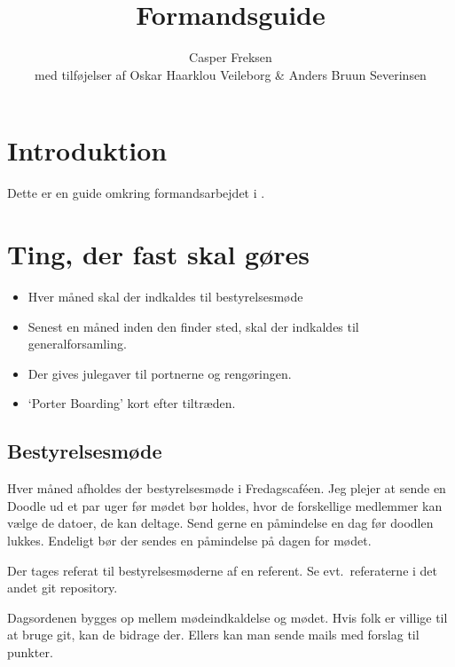 

\title{Formandsguide}
\date{}
\author{Casper Freksen\\
\small med tilføjelser af Oskar Haarklou Veileborg
\& Anders Bruun Severinsen}



\maketitle

\section{Introduktion}
\label{sec:introduktion}

Dette er en guide omkring formandsarbejdet i \fredagscafeen.

\section{Ting, der fast skal gøres}
\label{sec:ting-der-skal}

\begin{itemize}
    \item Hver måned skal der indkaldes til bestyrelsesmøde
    \item Senest en måned inden den finder sted, skal der indkaldes til
    generalforsamling.
    \item Der gives julegaver til portnerne og rengøringen.
    \item `Porter Boarding' kort efter tiltræden.
\end{itemize}

\subsection{Bestyrelsesmøde}
\label{sec:bestyrelsesmode}

Hver måned afholdes der bestyrelsesmøde i Fredagscaféen. Jeg plejer at
sende en Doodle ud et par uger før mødet bør holdes, hvor de forskellige medlemmer kan
vælge de datoer, de kan deltage. Send gerne en påmindelse en dag før doodlen
lukkes. Endeligt bør der sendes en påmindelse på dagen for mødet.

Der tages referat til bestyrelsesmøderne af en referent. Se
evt.~referaterne i det andet git repository.

Dagsordenen bygges op mellem mødeindkaldelse og mødet. Hvis folk er
villige til at bruge git, kan de bidrage der. Ellers kan man sende
mails med forslag til punkter.

